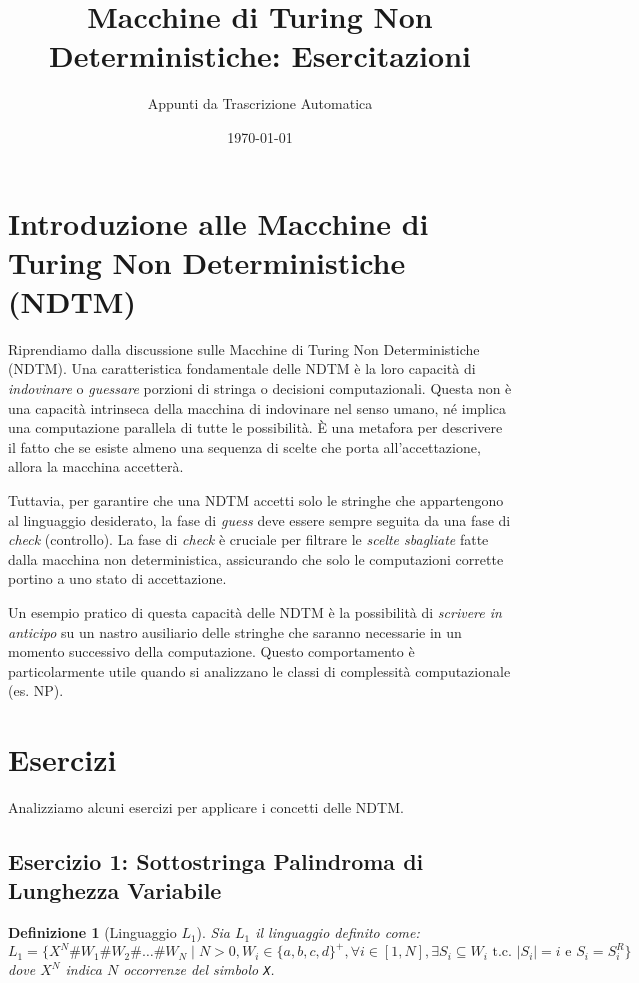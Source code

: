 \documentclass[a4paper]{article}
\title{Macchine di Turing Non Deterministiche: Esercitazioni}
\author{Appunti da Trascrizione Automatica}
\date{\today}
\newtheorem{definition}{Definizione}
\begin{document}
\maketitle
\tableofcontents
\newpage

\section{Introduzione alle Macchine di Turing Non Deterministiche (NDTM)}

Riprendiamo dalla discussione sulle Macchine di Turing Non Deterministiche (NDTM).
Una caratteristica fondamentale delle NDTM è la loro capacità di \textit{indovinare} o \textit{guessare} porzioni di stringa o decisioni computazionali. Questa non è una capacità intrinseca della macchina di indovinare nel senso umano, né implica una computazione parallela di tutte le possibilità. È una metafora per descrivere il fatto che se esiste almeno una sequenza di scelte che porta all'accettazione, allora la macchina accetterà.

Tuttavia, per garantire che una NDTM accetti solo le stringhe che appartengono al linguaggio desiderato, la fase di \textit{guess} deve essere sempre seguita da una fase di \textit{check} (controllo). La fase di \textit{check} è cruciale per filtrare le \textit{scelte sbagliate} fatte dalla macchina non deterministica, assicurando che solo le computazioni corrette portino a uno stato di accettazione.

Un esempio pratico di questa capacità delle NDTM è la possibilità di \textit{scrivere in anticipo} su un nastro ausiliario delle stringhe che saranno necessarie in un momento successivo della computazione. Questo comportamento è particolarmente utile quando si analizzano le classi di complessità computazionale (es. NP).

\section{Esercizi}

Analizziamo alcuni esercizi per applicare i concetti delle NDTM.

\subsection{Esercizio 1: Sottostringa Palindroma di Lunghezza Variabile}

\begin{definition}[Linguaggio $L_1$]
Sia $L_1$ il linguaggio definito come:
$L_1 = \{ X^N \texttt{\#} W_1 \texttt{\#} W_2 \texttt{\#} \dots \texttt{\#} W_N \mid N > 0, W_i \in \{a,b,c,d\}^+, \forall i \in [1, N], \exists S_i \subseteq W_i \text{ t.c. } |S_i| = i \text{ e } S_i = S_i^R \}$
dove $X^N$ indica $N$ occorrenze del simbolo \texttt{X}.
\end{definition}
\end{document}
